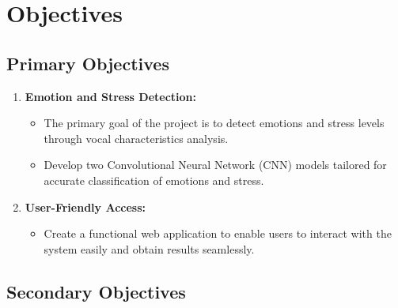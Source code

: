 
\chapter{Objectives}

\section{Primary Objectives}

\begin{enumerate}
    \item \textbf{Emotion and Stress Detection:}
    \begin{itemize}
        \item The primary goal of the project is to detect emotions and stress levels through vocal characteristics analysis.
        \item Develop two Convolutional Neural Network (CNN) models tailored for accurate classification of emotions and stress.
    \end{itemize}
    \item \textbf{User-Friendly Access:}
    \begin{itemize}
        \item Create a functional web application to enable users to interact with the system easily and obtain results seamlessly.
    \end{itemize}
\end{enumerate}

\section{Secondary Objectives}

